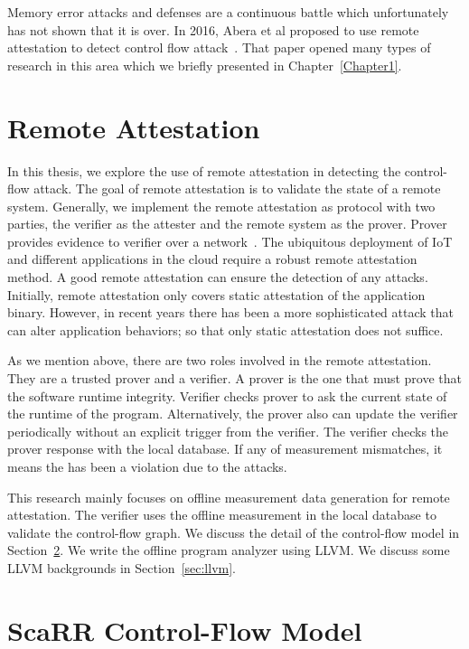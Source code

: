 Memory error attacks and defenses are a continuous battle which unfortunately
has not shown that it is over. In 2016, Abera et al proposed to use remote
attestation to detect control flow
attack~\cite{aberaCFLATControlFlowAttestation2016}. That paper opened many types
of research in this area which we briefly presented in Chapter~\ref{Chapter1}.
 
\section{Remote Attestation}
\label{sec:remote-attestation}

In this thesis, we explore the use of remote attestation in detecting the
control-flow attack. The goal of remote attestation is to validate the state of
a remote system. Generally, we implement the remote attestation as protocol with
two parties, the verifier as the attester and the remote system as the prover.
Prover provides evidence to verifier over a
network~\cite{cokerPrinciplesRemoteAttestation2011a}. The ubiquitous deployment
of IoT and different applications in the cloud require a robust remote
attestation method. A good remote attestation can ensure the detection of any
attacks. Initially, remote attestation only covers static attestation of the
application binary. However, in recent years there has been a more sophisticated
attack that can alter application behaviors; so that only static attestation
does not suffice. 

As we mention above, there are two roles involved in the remote attestation.
They are a trusted prover and a verifier. A prover is the one that must prove
that the software runtime integrity. Verifier checks prover to ask the current
state of the runtime of the program. Alternatively, the prover also can update
the verifier periodically without an explicit trigger from the verifier. The
verifier checks the prover response with the local database. If any of
measurement mismatches, it means the has been a violation due to the attacks.

This research mainly focuses on offline measurement data generation for remote
attestation. The verifier uses the offline measurement in the local database to
validate the control-flow graph.  We discuss the detail of the control-flow
model in Section~\ref{sec:scarr-model}. We write the offline program analyzer
using LLVM. We discuss some LLVM backgrounds in Section~\ref{sec:llvm}.

\section{ScaRR Control-Flow Model} 
\label{sec:scarr-model}

